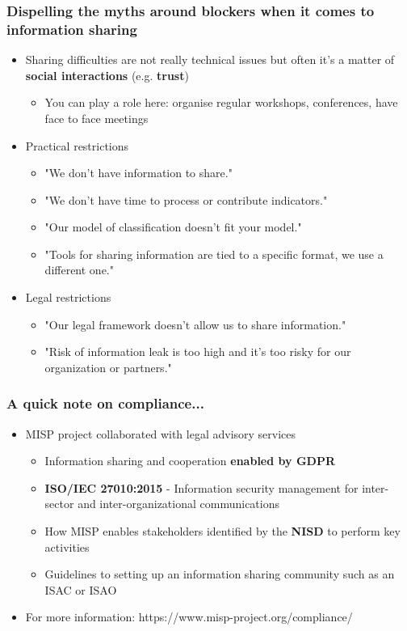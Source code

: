\begin{frame}
	\frametitle{Dispelling the myths around blockers when it comes to information sharing}
	\begin{itemize}
		\item Sharing difficulties are not really technical issues but often it's a matter of \textbf{social interactions} (e.g. \textbf{trust})
		\begin{itemize}
			\item You can play a role here: organise regular workshops, conferences, have face to face meetings
		\end{itemize}
		\item Practical restrictions
		\begin{itemize}
			\item "We don't have information to share."
			\item "We don't have time to process or contribute indicators."
			\item "Our model of classification doesn't fit your model."
			\item "Tools for sharing information are tied to a specific format, we use a different one."
		\end{itemize}
		\item Legal restrictions
		\begin{itemize}
			\item "Our legal framework doesn't allow us to share information."
			\item "Risk of information leak is too high and it's too risky for our organization or partners."
		\end{itemize}
	\end{itemize}
\end{frame}

\begin{frame}
\frametitle{A quick note on compliance...}
\begin{itemize}
	\item MISP project collaborated with legal advisory services
	\begin{itemize}
		\item Information sharing and cooperation \textbf{enabled by GDPR}
        \item \textbf{ISO/IEC 27010:2015} - Information security management for inter-sector and inter-organizational communications
		\item How MISP enables stakeholders identified by the \textbf{NISD} to perform key activities
        \item Guidelines to setting up an information sharing community such as an ISAC or ISAO
	\end{itemize}
	\item For more information: https://www.misp-project.org/compliance/
\end{itemize}
\end{frame}

